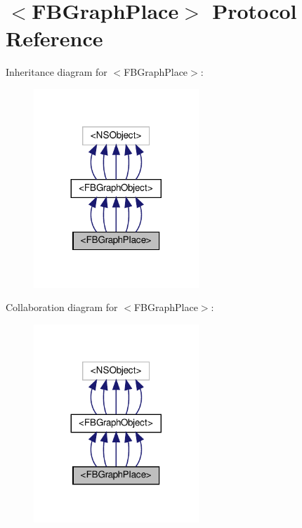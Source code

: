 \hypertarget{protocolFBGraphPlace-p}{}\section{$<$F\+B\+Graph\+Place$>$ Protocol Reference}
\label{protocolFBGraphPlace-p}


Inheritance diagram for $<$F\+B\+Graph\+Place$>$\+:
\nopagebreak
\begin{figure}[H]
\begin{center}
\leavevmode
\includegraphics[width=176pt]{protocolFBGraphPlace-p__inherit__graph}
\end{center}
\end{figure}


Collaboration diagram for $<$F\+B\+Graph\+Place$>$\+:
\nopagebreak
\begin{figure}[H]
\begin{center}
\leavevmode
\includegraphics[width=176pt]{protocolFBGraphPlace-p__coll__graph}
\end{center}
\end{figure}
